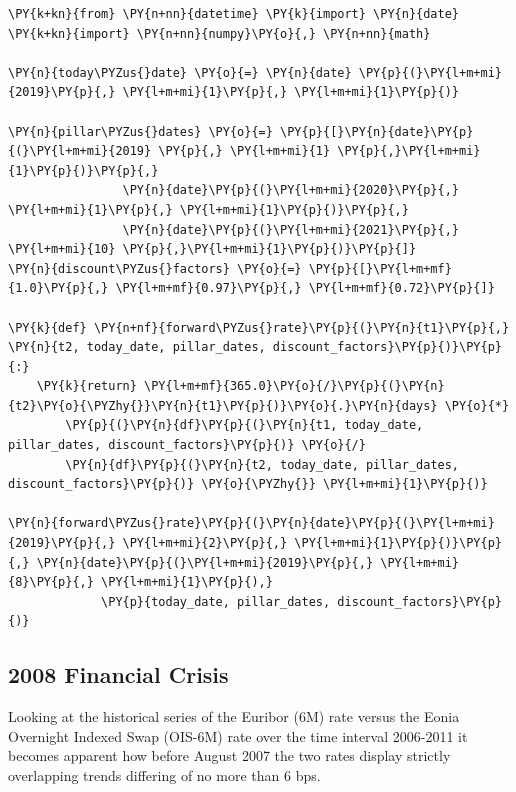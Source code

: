 \begin{tcolorbox}[breakable, size=fbox, boxrule=1pt, pad at break*=1mm,colback=cellbackground, colframe=cellborder]
\begin{Verbatim}[commandchars=\\\{\}]
\PY{k+kn}{from} \PY{n+nn}{datetime} \PY{k}{import} \PY{n}{date}
\PY{k+kn}{import} \PY{n+nn}{numpy}\PY{o}{,} \PY{n+nn}{math}

\PY{n}{today\PYZus{}date} \PY{o}{=} \PY{n}{date} \PY{p}{(}\PY{l+m+mi}{2019}\PY{p}{,} \PY{l+m+mi}{1}\PY{p}{,} \PY{l+m+mi}{1}\PY{p}{)}

\PY{n}{pillar\PYZus{}dates} \PY{o}{=} \PY{p}{[}\PY{n}{date}\PY{p}{(}\PY{l+m+mi}{2019} \PY{p}{,} \PY{l+m+mi}{1} \PY{p}{,}\PY{l+m+mi}{1}\PY{p}{)}\PY{p}{,} 
                \PY{n}{date}\PY{p}{(}\PY{l+m+mi}{2020}\PY{p}{,} \PY{l+m+mi}{1}\PY{p}{,} \PY{l+m+mi}{1}\PY{p}{)}\PY{p}{,} 
                \PY{n}{date}\PY{p}{(}\PY{l+m+mi}{2021}\PY{p}{,} \PY{l+m+mi}{10} \PY{p}{,}\PY{l+m+mi}{1}\PY{p}{)}\PY{p}{]}
\PY{n}{discount\PYZus{}factors} \PY{o}{=} \PY{p}{[}\PY{l+m+mf}{1.0}\PY{p}{,} \PY{l+m+mf}{0.97}\PY{p}{,} \PY{l+m+mf}{0.72}\PY{p}{]}

\PY{k}{def} \PY{n+nf}{forward\PYZus{}rate}\PY{p}{(}\PY{n}{t1}\PY{p}{,} \PY{n}{t2, today_date, pillar_dates, discount_factors}\PY{p}{)}\PY{p}{:}
    \PY{k}{return} \PY{l+m+mf}{365.0}\PY{o}{/}\PY{p}{(}\PY{n}{t2}\PY{o}{\PYZhy{}}\PY{n}{t1}\PY{p}{)}\PY{o}{.}\PY{n}{days} \PY{o}{*}
        \PY{p}{(}\PY{n}{df}\PY{p}{(}\PY{n}{t1, today_date, pillar_dates, discount_factors}\PY{p}{)} \PY{o}{/}
        \PY{n}{df}\PY{p}{(}\PY{n}{t2, today_date, pillar_dates, discount_factors}\PY{p}{)} \PY{o}{\PYZhy{}} \PY{l+m+mi}{1}\PY{p}{)}

\PY{n}{forward\PYZus{}rate}\PY{p}{(}\PY{n}{date}\PY{p}{(}\PY{l+m+mi}{2019}\PY{p}{,} \PY{l+m+mi}{2}\PY{p}{,} \PY{l+m+mi}{1}\PY{p}{)}\PY{p}{,} \PY{n}{date}\PY{p}{(}\PY{l+m+mi}{2019}\PY{p}{,} \PY{l+m+mi}{8}\PY{p}{,} \PY{l+m+mi}{1}\PY{p}{),}
             \PY{p}{today_date, pillar_dates, discount_factors}\PY{p}{)}
\end{Verbatim}
\end{tcolorbox}

\subsection{2008 Financial Crisis}\label{financial-crisis}

Looking at the historical series of the Euribor (6M) rate versus the Eonia Overnight Indexed Swap (OIS-6M) rate over the time interval 2006-2011 it becomes apparent how before August 2007 the two rates display strictly overlapping trends differing of no more than 6 bps.

